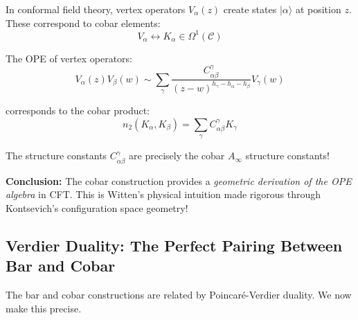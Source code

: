 \begin{remark}\label{rem:vertex-operators-cobar}
In conformal field theory, vertex operators $V_\alpha(z)$ create states $|\alpha\rangle$ 
at position $z$. These correspond to cobar elements:
$$V_\alpha \leftrightarrow K_\alpha \in \Omega^1(\mathcal{C})$$

The OPE of vertex operators:
$$V_\alpha(z) V_\beta(w) \sim \sum_\gamma \frac{C_{\alpha\beta}^\gamma}{(z-w)^{h_\gamma - h_\alpha - h_\beta}} V_\gamma(w)$$

corresponds to the cobar product:
$$n_2(K_\alpha, K_\beta) = \sum_\gamma C_{\alpha\beta}^\gamma K_\gamma$$

The structure constants $C_{\alpha\beta}^\gamma$ are precisely the cobar $A_\infty$ 
structure constants!

\textbf{Conclusion:} The cobar construction provides a \emph{geometric derivation 
of the OPE algebra} in CFT. This is Witten's physical intuition made rigorous 
through Kontsevich's configuration space geometry!
\end{remark}

\subsection{Verdier Duality: The Perfect Pairing Between Bar and Cobar}

The bar and cobar constructions are related by Poincaré-Verdier duality. We now 
make this precise.

